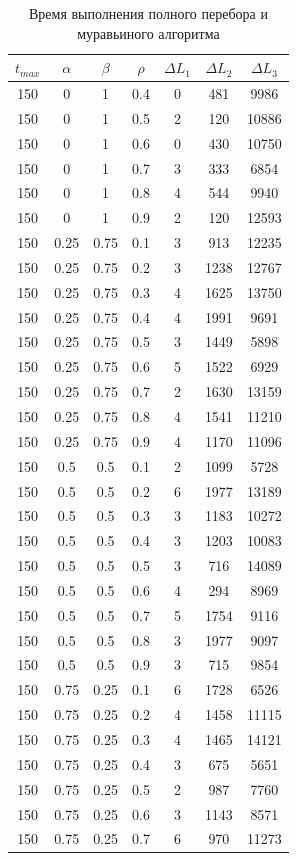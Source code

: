 \documentclass[a4paper,oneside,14pt]{extreport}
\begin{document}
\begin{table}[H]
\begin{center}
	\caption[]{\label{tbl:only} Время выполнения полного перебора и муравьиного алгоритма}
	\begin{tabular}{|c|c|c|c|c|c|c|}
		\hline
		$t_{max}$ & $\alpha$ & $\beta$ &$\rho$ & $\Delta L_{1}$ & $\Delta L_{2}$ & $\Delta L_{3}$\\
		\hline		150 & 0 & 1 & 0.4 & 0 & 481 & 9986 \\
		150 & 0 & 1 & 0.5 & 2 & 120 & 10886 \\
		150 & 0 & 1 & 0.6 & 0 & 430 & 10750 \\
		150 & 0 & 1 & 0.7 & 3 & 333 & 6854 \\
		150 & 0 & 1 & 0.8 & 4 & 544 & 9940 \\
		150 & 0 & 1 & 0.9 & 2 & 120 & 12593 \\
		150 & 0.25 & 0.75 & 0.1 & 3 & 913 & 12235 \\
		150 & 0.25 & 0.75 & 0.2 & 3 & 1238 & 12767 \\
		150 & 0.25 & 0.75 & 0.3 & 4 & 1625 & 13750 \\
		150 & 0.25 & 0.75 & 0.4 & 4 & 1991 & 9691 \\
		150 & 0.25 & 0.75 & 0.5 & 3 & 1449 & 5898 \\
		150 & 0.25 & 0.75 & 0.6 & 5 & 1522 & 6929 \\
		150 & 0.25 & 0.75 & 0.7 & 2 & 1630 & 13159 \\
		150 & 0.25 & 0.75 & 0.8 & 4 & 1541 & 11210 \\
		150 & 0.25 & 0.75 & 0.9 & 4 & 1170 & 11096 \\
		150 & 0.5 & 0.5 & 0.1 & 2 & 1099 & 5728 \\
		150 & 0.5 & 0.5 & 0.2 & 6 & 1977 & 13189 \\
		150 & 0.5 & 0.5 & 0.3 & 3 & 1183 & 10272 \\
		150 & 0.5 & 0.5 & 0.4 & 3 & 1203 & 10083 \\
		150 & 0.5 & 0.5 & 0.5 & 3 & 716 & 14089 \\
		150 & 0.5 & 0.5 & 0.6 & 4 & 294 & 8969 \\
		150 & 0.5 & 0.5 & 0.7 & 5 & 1754 & 9116 \\
		150 & 0.5 & 0.5 & 0.8 & 3 & 1977 & 9097 \\
		150 & 0.5 & 0.5 & 0.9 & 3 & 715 & 9854 \\
		150 & 0.75 & 0.25 & 0.1 & 6 & 1728 & 6526 \\
		150 & 0.75 & 0.25 & 0.2 & 4 & 1458 & 11115 \\
		150 & 0.75 & 0.25 & 0.3 & 4 & 1465 & 14121 \\
		150 & 0.75 & 0.25 & 0.4 & 3 & 675 & 5651 \\
		150 & 0.75 & 0.25 & 0.5 & 2 & 987 & 7760 \\
		150 & 0.75 & 0.25 & 0.6 & 3 & 1143 & 8571 \\
		150 & 0.75 & 0.25 & 0.7 & 6 & 970 & 11273 \\
		\hline	
	\end{tabular}
\end{center}
\end{table}
\end{document}
